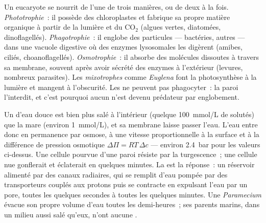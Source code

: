 \begin{definition}\label{def:b2:unicellular-diversity:nutrition}
Un eucaryote  se nourrit de l'une de trois manières, ou de
deux à la fois. \emph{Phototrophie}~: il possède des chloroplastes et
fabrique sa propre matière organique à partir de la lumière et du
$\mathrm{CO_2}$ (algues vertes, diatomées, dinoflagellés).
\emph{Phagotrophie}~: il englobe des particules --- bactéries, autres
 --- dans une vacuole digestive où des enzymes lysosomales les
digèrent (amibes, ciliés, choanoflagellés). \emph{Osmotrophie}~: il
absorbe des molécules dissoutes à travers sa membrane, souvent après
avoir sécrété des enzymes à l'extérieur (levures, nombreux parasites).
Les \emph{mixotrophes} comme \emph{Euglena} font la photosynthèse à la
lumière et mangent à l'obscurité. Les  ne peuvent pas
phagocyter~: la paroi l'interdit, et c'est pourquoi aucun 
n'est devenu prédateur par englobement.
\end{definition}

\begin{proposition}\label{prop:b2:unicellular-diversity:osmoregulation}
Un  d'eau douce est bien plus salé à l'intérieur (quelque
\qty{100}{mmol/L} de solutés) que la mare (environ \qty{1}{mmol/L}), et
sa membrane laisse passer l'eau. L'eau entre donc en permanence par
osmose, à une vitesse proportionnelle à la surface et à la différence
de pression osmotique $\Delta\Pi = RT\,\Delta c$ --- environ
\qty{2.4}{bar} pour les valeurs ci-dessus. Une cellule pourvue d'une
paroi résiste par la turgescence~; une cellule nue gonflerait et
éclaterait en quelques minutes. La \emph{} est la
réponse~: un réservoir alimenté par des canaux radiaires, qui se remplit
d'eau pompée par des transporteurs couplés aux protons puis se
contracte en expulsant l'eau par un pore, toutes les quelques secondes à
toutes les quelques minutes. Une \emph{Paramecium} évacue son propre
volume d'eau toutes les demi-heures~; ses parents marins, dans un milieu
aussi salé qu'eux, n'ont aucune .
\end{proposition}

